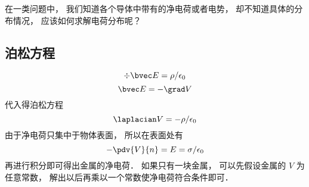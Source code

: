 
\begin{issues}
\issueDraft
\end{issues}

在一类问题中， 我们知道各个导体中带有的净电荷或者电势， 却不知道具体的分布情况， 应该如何求解电荷分布呢？

\subsection{泊松方程}
\begin{equation}
\div \bvec E = \rho/\epsilon_0
\end{equation}
\begin{equation}
\bvec E = -\grad V
\end{equation}
代入得泊松方程
\begin{equation}
\laplacian V = -\rho/\epsilon_0
\end{equation}
由于净电荷只集中于物体表面， 所以在表面处有
\begin{equation}
-\pdv{V}{n} = E = \sigma/\epsilon_0
\end{equation}
再进行积分即可得出金属的净电荷． 如果只有一块金属， 可以先假设金属的 $V$ 为任意常数， 解出以后再乘以一个常数使净电荷符合条件即可．

